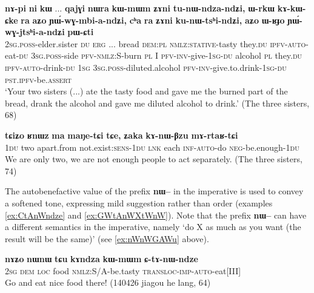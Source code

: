 \documentclass[oldfontcommands,oneside,a4paper,11pt]{article}
\newcommand{\ipa}[1]{\textbf{{\phon\mbox{#1}}}} %
\begin{document}
   \begin{exe}
\ex \label{ex:tunWndzandZi}
\gll  \ipa{nɤ-pi}   	\ipa{ni}   	\ipa{kɯ}   	...   	\ipa{qajɣi}   	\ipa{nɯra}   	\ipa{kɯ-mɯm}   	\textbf{\ipa{ʑɤni}}   	\ipa{tu-nɯ-ndza-ndʑi,}   	\ipa{ɯ-rkɯ}   	\ipa{kɤ-kɯ-ɕke}   	\ipa{ra}   	\ipa{aʑo}   	\ipa{ɲɯ́-wɣ-mbi-a-ndʑi,}   	\ipa{cʰa}   	\ipa{ra}   	\textbf{\ipa{ʑɤni}}   	\ipa{ku-nɯ-tsʰi-ndʑi,}   	\ipa{aʑo}   	\ipa{ɯ-ʁɟo}   	\ipa{ɲɯ́-wɣ-jtsʰi-a-ndʑi}   	\ipa{pɯ-ɕti}        \\
\textsc{2sg.poss}-elder.sister \textsc{du} \textsc{erg} ... bread \textsc{dem:pl} \textsc{nmlz:stative}-tasty they.\textsc{du} \textsc{ipfv}-\textsc{auto}-eat-\textsc{du} \textsc{3sg.poss}-side \textsc{pfv}-\textsc{nmlz:S}-burn \textsc{pl}  I \textsc{pfv}-\textsc{inv}-give-\textsc{1sg}-\textsc{du} alcohol \textsc{pl} they.\textsc{du} \textsc{ipfv}-\textsc{auto}-drink-\textsc{du} \textsc{1sg} \textsc{3sg.poss}-diluted.alcohol \textsc{pfv}-\textsc{inv}-give.to.drink-\textsc{1sg}-\textsc{du} \textsc{pst.ipfv}-be.\textsc{assert}  \\
 \glt    `Your two sisters (...) ate the tasty food and gave me the burned part of the bread, drank the alcohol and gave me diluted alcohol to drink.'  (The three sisters, 68)
\end{exe} 



   \begin{exe}
\ex \label{ex:kAnWBzu.mArtaRtCi}
\gll
\ipa{tɕiʑo} 	\ipa{ʁnɯz} 	\ipa{ma} 	\ipa{maŋe-tɕi} 	\ipa{tɕe,} 	\ipa{ʑaka} 	\ipa{kɤ-nɯ-βzu} 	\ipa{mɤ-rtaʁ-tɕi} \\
\textsc{1du} two apart.from not.exist:\textsc{sens}-\textsc{1du} \textsc{lnk} each \textsc{inf-auto}-do \textsc{neg}-be.enough-\textsc{1du} \\
\glt We are only two, we are not enough people to act separately. (The three sisters, 74)
\end{exe} 

The autobenefactive value of the prefix \ipa{nɯ--}  in the imperative is used to convey a softened tone, expressing mild suggestion rather than order (examples \ref{ex:CtAnWndze} and \ref{ex:GWtAnWXtWnW}). Note that the prefix \ipa{nɯ--}  can have a different semantics in the imperative, namely `do X as much as you want (the result will be the same)' (see  \ref{ex:nWnWGAWu} above).

\begin{exe}
\ex \label{ex:CtAnWndze}
\gll
\ipa{nɤʑo} 	\ipa{nɯnɯ} \ipa{tɕu} 	\ipa{kɤndza} 	\ipa{kɯ-mɯm} 	\ipa{ɕ-tɤ-nɯ-ndze} \\
\textsc{2sg} \textsc{dem} \textsc{loc} food \textsc{nmlz}:S/A-be.tasty \textsc{transloc-imp-auto}-eat[III] \\
\glt Go and eat nice food there! (140426 jiagou he lang, 64)
\end{exe}
\end{document}
